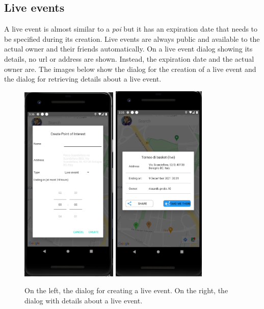 \documentclass[../../main]{subfiles}
\begin{document}
\subsection{Live events}
\label{ss:final-live}

A live event is almost similar to a \textit{poi} but it has an expiration date that needs to be specified during its creation.
Live events are always public and available to the actual owner and their friends automatically.
On a live event dialog showing its details, no url or address are shown.
Instead, the expiration date and the actual owner are.
The images below show the dialog for the creation of a live event and the dialog for retrieving details about a live event.
\begin{figure}[H]
    \centering
    \includegraphics[width=0.41\textwidth]{images/app/live/creazione_live}
    \includegraphics[width=0.4\textwidth]{images/app/live/live_map_detail}
    \caption{On the left, the dialog for creating a live event. On the right, the dialog with details about a live event.}
\end{figure}
\end{document}
